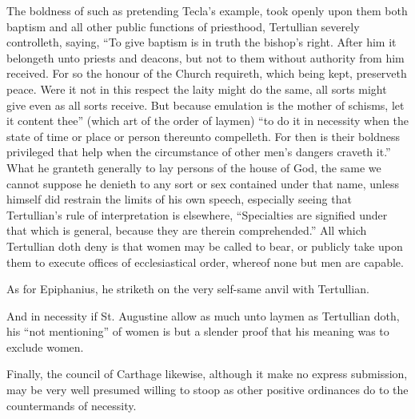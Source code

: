 The boldness of such as pretending Tecla’s example, took openly upon them both baptism and all other public functions of priesthood, Tertullian severely controlleth, saying, “To give baptism is in truth the bishop’s right. After him it belongeth unto priests and deacons, but not to them without authority from him received. For so the honour of the Church requireth, which being kept, preserveth peace. Were it not in this respect the laity might do the same, all sorts might give even as all sorts receive. But because emulation is the mother of schisms, let it content thee” (which  art of the order of laymen) “to do it in necessity when the state of time or place or person thereunto compelleth. For then is their boldness privileged that help when the circumstance of other men’s dangers craveth it.” What he granteth generally to lay persons of the house of God, the same we cannot suppose he denieth to any sort or sex contained under that name, unless himself did restrain the limits of his own speech, especially seeing that Tertullian’s rule of interpretation is elsewhere, “Specialties are signified under that which is general, because they are therein comprehended.” All which Tertullian doth deny is that women may be called to bear, or publicly take upon them to execute offices of ecclesiastical order, whereof none but men are capable.

As for Epiphanius, he striketh on the very self-same anvil with Tertullian.

And in necessity if St. Augustine allow as much unto laymen as Tertullian doth, his “not mentioning” of women is but a slender proof that his meaning was to exclude women.

Finally, the council of Carthage likewise, although it  make no express submission, may be very well presumed willing to stoop as other positive ordinances do to the countermands of necessity.

